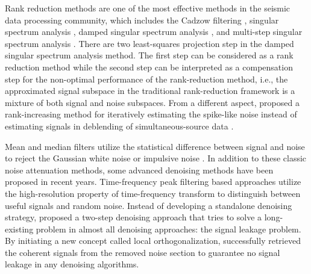 Rank reduction methods are one of the most effective methods in the seismic data processing community, which includes the Cadzow filtering \cite[]{trickett2008}, singular spectrum analysis \cite[]{vautard1992singular,wujuan2018jge,yatong2018gji}, damped  singular spectrum analysis \cite[]{yangkang2016irr5d,zhangdong2016eage,zhangdong2016seg}, and multi-step singular spectrum analysis \cite[]{zhangdong2016cseg}. There are two least-squares projection step in the damped  singular spectrum analysis method. The first step can be considered as a rank reduction method while the second step can be interpreted as a compensation step for the non-optimal performance of the rank-reduction method, i.e., the approximated signal subspace in the traditional rank-reduction framework is a mixture of both signal and noise subspaces. From a different aspect, \cite{yaru2016dblend} proposed a rank-increasing method for iteratively estimating the spike-like noise instead of estimating signals in deblending of simultaneous-source data \cite[]{shaohuan2016,shaohuan2016seg,baimin2017jse1,yatong2018jse,wujuan2018cg1,baimin2018cg,baimin2018jse1}.  

Mean and median filters utilize the statistical difference between signal and noise to reject the Gaussian white noise or impulsive noise \cite[]{liuyang2009tvmf,yike2013}. In addition to these classic noise attenuation methods, some advanced denoising methods have been proposed in recent years. Time-frequency peak filtering \cite[]{kahoo2009,lin2013,hongbo2015} based approaches utilize the high-resolution property of time-frequency transform to distinguish between useful signals and random noise. Instead of developing a standalone denoising strategy, \cite{yangkang2015ortho} proposed a two-step denoising approach that tries to solve a long-existing problem in almost all denoising approaches: the signal leakage problem. By initiating a new concept called local orthogonalization, \cite{yangkang2015ortho} successfully retrieved the coherent signals from the removed noise section to guarantee no signal leakage in any denoising algorithms.


